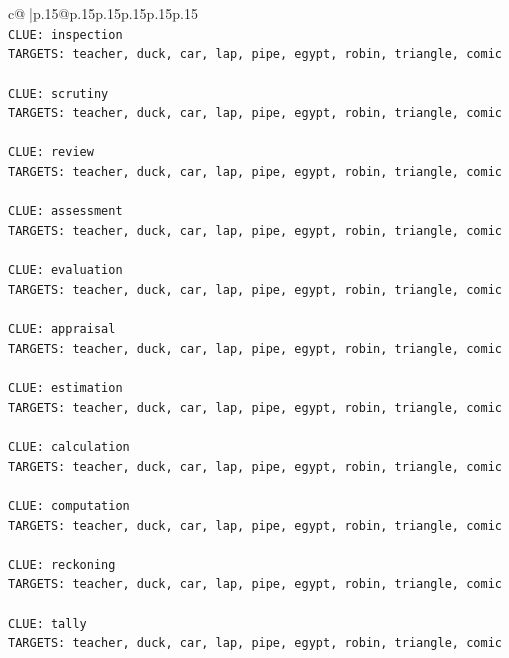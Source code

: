 \documentclass{article}
\begin{document}
{\begin{supertabular}{c@{$\;$}|p{.15\linewidth}@{}p{.15\linewidth}p{.15\linewidth}p{.15\linewidth}p{.15\linewidth}p{.15\linewidth}}
{{{\\ 
\texttt{CLUE: inspection} \\
\texttt{TARGETS: teacher, duck, car, lap, pipe, egypt, robin, triangle, comic} \\
\\ 
\texttt{CLUE: scrutiny} \\
\texttt{TARGETS: teacher, duck, car, lap, pipe, egypt, robin, triangle, comic} \\
\\ 
\texttt{CLUE: review} \\
\texttt{TARGETS: teacher, duck, car, lap, pipe, egypt, robin, triangle, comic} \\
\\ 
\texttt{CLUE: assessment} \\
\texttt{TARGETS: teacher, duck, car, lap, pipe, egypt, robin, triangle, comic} \\
\\ 
\texttt{CLUE: evaluation} \\
\texttt{TARGETS: teacher, duck, car, lap, pipe, egypt, robin, triangle, comic} \\
\\ 
\texttt{CLUE: appraisal} \\
\texttt{TARGETS: teacher, duck, car, lap, pipe, egypt, robin, triangle, comic} \\
\\ 
\texttt{CLUE: estimation} \\
\texttt{TARGETS: teacher, duck, car, lap, pipe, egypt, robin, triangle, comic} \\
\\ 
\texttt{CLUE: calculation} \\
\texttt{TARGETS: teacher, duck, car, lap, pipe, egypt, robin, triangle, comic} \\
\\ 
\texttt{CLUE: computation} \\
\texttt{TARGETS: teacher, duck, car, lap, pipe, egypt, robin, triangle, comic} \\
\\ 
\texttt{CLUE: reckoning} \\
\texttt{TARGETS: teacher, duck, car, lap, pipe, egypt, robin, triangle, comic} \\
\\ 
\texttt{CLUE: tally} \\
\texttt{TARGETS: teacher, duck, car, lap, pipe, egypt, robin, triangle, comic} \\
\\ 
}}}
\end{supertabular}}
\end{document}
